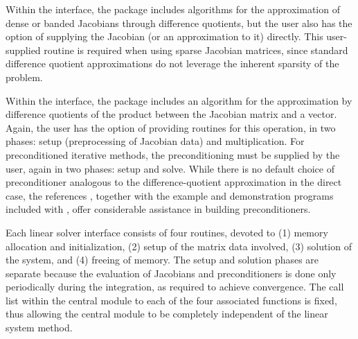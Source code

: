 Within the {\idadls} interface, the package includes algorithms for the
approximation of dense or banded Jacobians through difference 
quotients, but the user also has the option of supplying the Jacobian
(or an approximation to it) directly.  This user-supplied 
routine is required when using sparse Jacobian matrices, since
standard difference quotient approximations do not leverage the
inherent sparsity of the problem.

Within the {\idaspils} interface, the package includes an algorithm for
the approximation by difference quotients of the product between the Jacobian
matrix and a vector. Again,
the user has the option of providing routines for this operation, in
two phases: setup (preprocessing of Jacobian data) and multiplication.
For preconditioned iterative methods,  
the preconditioning must be supplied by the user, again in two phases: 
setup and solve.  While there is no
default choice of preconditioner analogous to the difference-quotient
approximation in the direct case, the references
\cite{BrHi:89,Byr:92}, together with the example and demonstration
programs included with {\idas}, offer considerable assistance in
building preconditioners. 

Each {\idas} linear solver interface consists of four routines, devoted to
(1) memory allocation and initialization, (2) setup of the matrix data
involved, (3) solution of the system, and (4) freeing of memory.  
The setup and solution phases are separate because the evaluation of
Jacobians and preconditioners is done only periodically during the
integration, as required to achieve convergence. The call list within
the central {\idas} module to each of the four associated functions is
fixed, thus allowing the central module to be completely independent
of the linear system method.


